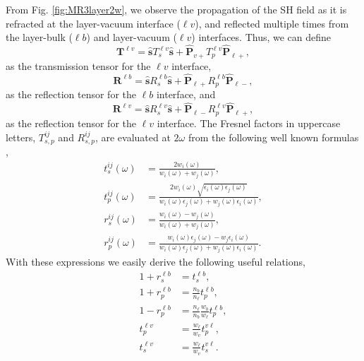 \documentclass[aps,pra,10pt,amsmath,twocolumn,letterpaper]{revtex4-1}
\begin{document}
From Fig. \ref{fig:MR3layer2w}, we observe the propagation of the SH field as it
is refracted at the layer-vacuum interface ($\ell v$), and  reflected multiple
times from the layer-bulk ($\ell b$) and layer-vacuum ($\ell v$) interfaces.
Thus, we can define
\begin{equation}\label{eq:r5}
\mathbf{T}^{\ell v}
= \hat{\mathbf{s}}T_{s}^{\ell v}\hat{\mathbf{s}} 
+ \hat{\mathbf{P}}_{v+}T_{p}^{\ell v} \hat{\mathbf{P}}_{\ell +},
\end{equation}
as the transmission tensor for the $\ell v$ interface,
\begin{equation}\label{eq:r6}
\mathbf{R}^{\ell b}
= \hat{\mathbf{s}}R_{s}^{\ell b}\hat{\mathbf{s}}
+ \hat{\mathbf{P}}_{\ell +}R_{p}^{\ell b} \hat{\mathbf{P}}_{\ell -},
\end{equation} 
as the reflection tensor for the $\ell b$ interface, and
\begin{equation}\label{eq:r6b}
\mathbf{R}^{\ell v}
= \hat{\mathbf{s}}R_{s}^{\ell v}\hat{\mathbf{s}}
+ \hat{\mathbf{P}}_{\ell -}R_{p}^{\ell v} \hat{\mathbf{P}}_{\ell +},
\end{equation} 
as the reflection tensor for the $\ell v$ interface. The Fresnel factors in
uppercase letters, $T^{ij}_{s,p}$ and $R^{ij}_{s,p}$, are evaluated at $2\omega$
from the following well known formulas \cite{jacksonbook},
\begin{equation*}\label{eq:e.f1}
\begin{split}
t_{s}^{ij}(\omega) &=
\frac{2w_{i}(\omega)}{w_{i}(\omega) + w_{j}(\omega)},\\
t_{p}^{ij}(\omega) &=
\frac{2w_{i}(\omega)\sqrt{\epsilon_{i}(\omega)\epsilon_j(\omega)}}
     {w_{i}(\omega)\epsilon_{j}(\omega) + w_{j}(\omega)\epsilon_{i}(\omega)},\\
r_{s}^{ij}(\omega) &=
\frac{w_{i}(\omega) - w_{j}(\omega)}
     {w_{i}(\omega) + w_{j}(\omega)},\\
r_{p}^{ij}(\omega) &=
\frac{w_{i}(\omega)\epsilon_{j}(\omega) - w_{j}\epsilon_{i}(\omega)}
     {w_{i}(\omega)\epsilon_{j}(\omega) + w_{j}(\omega)\epsilon_{i}(\omega)}. 
\end{split}
\end{equation*}
With these expressions we easily derive the following useful relations,
\begin{equation}\label{eq:mf}
\begin{split}
1 + r^{\ell b}_{s} &= t^{\ell b}_{s},\\
1 + r^{\ell b}_{p} &= \frac{n_{b}}{n_{\ell}}t^{\ell b}_{p},\\
1 - r^{\ell b}_{p} &= \frac{n_{\ell}}{n_{b}}\frac{w_{b}}{w_{\ell}}
                      t^{\ell b}_{p},\\
t^{\ell v}_{p} &= \frac{w_{\ell}}{w_{v}}t^{v\ell}_{p},\\
t^{\ell v}_{s} &= \frac{w_{\ell}}{w_{v}}t^{v\ell}_{s}.
\end{split}
\end{equation}
\end{document}
